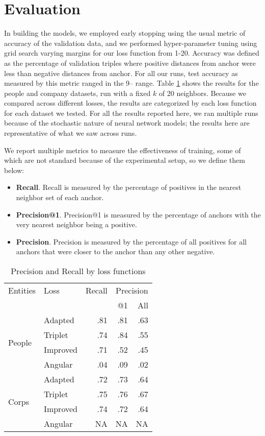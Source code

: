 \section{Evaluation}
\label{results}
In building the models, we employed early stopping using the usual metric of accuracy of the validation data, and we performed hyper-parameter tuning using grid search varying margins for our loss function from 1-20.  Accuracy was defined as the percentage of validation triples where positive distances from anchor were less than negative distances from anchor.  For all our runs, test accuracy as measured by this metric ranged in the 9-- range.  Table \ref{Evaluation} shows the results for the people and company datasets, run with a fixed $k$ of 20 neighbors.  Because we compared across different losses, the results are categorized by each loss function for each dataset we tested.  For all the results reported here, we ran multiple runs because of the stochastic nature of neural network models; the results here are representative of what we saw across runs. 

We report multiple metrics to measure the effectiveness of training, some of which are not standard because of the experimental setup, so we define them below:
\begin{itemize}
\item \textbf{Recall}.  Recall is measured by the percentage of positives in the nearest neighbor set of each anchor.
\item \textbf{Precision@1}.  Precision@1 is measured by the percentage of anchors with the very nearest neighbor being a positive.
\item \textbf{Precision}.  Precision is measured by the percentage of all positives for all anchors that were closer to the anchor than any other negative.
\end{itemize}
 
\begin{table}[ht]
\caption{Precision and Recall by loss functions}
\label{Evaluation}
\begin{center}
{\scriptsize
\begin{tabular}{l|l|r|r|r|}
\hline
Entities & Loss & Recall & \multicolumn{2}{|c|}{Precision} \\
 & & & @1 & All \\
\hline
\multirow{4}{*}{People} & Adapted & .81 & .81 & .63 \\
\cline{2-5}
& Triplet & .74 & .84 & .55 \\
\cline{2-5}
& Improved & .71 & .52 & .45 \\
\cline{2-5}
& Angular & .04 & .09 & .02 \\
\hline
\multirow{4}{*}{Corps} & Adapted & .72 & .73 & .64 \\
\cline{2-5}
& Triplet & .75 & .76 & .67 \\
\cline{2-5}
& Improved & .74 & .72 & .64 \\
\cline{2-5}
& Angular & NA & NA & NA \\
\hline
\end{tabular}}
\end{center}
\end{table}


